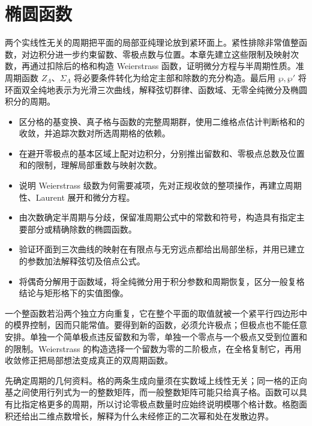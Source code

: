 \chapter{椭圆函数}
\label{b3:ch:22}
\begin{chapterabstract}
两个实线性无关的周期把平面的局部亚纯理论放到紧环面上。紧性排除非常值整函数，对边积分进一步约束留数、零极点数与位置。本章先建立这些限制及映射次数，再通过扣除后的格和构造 Weierstrass 函数，证明微分方程与半周期性质。准周期函数 \(Z_\Lambda\)、\(\Sigma_\Lambda\) 将必要条件转化为给定主部和除数的充分构造。最后用 \(\wp,\wp'\) 将环面双全纯地表示为光滑三次曲线，解释弦切群律、函数域、无零全纯微分及椭圆积分的周期。
\end{chapterabstract}

\begin{learninggoals}
\begin{itemize}
\item 区分格的基变换、真子格与函数的完整周期群，使用二维格点估计判断格和的收敛，并追踪次数对所选周期格的依赖。
\item 在避开零极点的基本区域上配对边积分，分别推出留数和、零极点总数及位置和的限制，理解局部重数与映射次数。
\item 说明 Weierstrass 级数为何需要减项，先对正规收敛的整项操作，再建立周期性、Laurent 展开和微分方程。
\item 由次数确定半周期与分歧，保留准周期公式中的常数和符号，构造具有指定主要部分或精确除数的椭圆函数。
\item 验证环面到三次曲线的映射在有限点与无穷远点都给出局部坐标，并用已建立的参数加法解释弦切及倍点公式。
\item 将偶奇分解用于函数域，将全纯微分用于积分参数和周期恢复，区分一般复格结论与矩形格下的实值图像。
\end{itemize}
\end{learninggoals}

一个整函数若沿两个独立方向重复，它在整个平面的取值就被一个紧平行四边形中的模界控制，因而只能常值。要得到新的函数，必须允许极点；但极点也不能任意安排。单独一个简单极点违反留数和为零，单独一个零点与一个极点又受到位置和的限制。Weierstrass 的构造选择一个留数为零的二阶极点，在全格复制它，再用收敛修正把局部想法变成真正的双周期函数。

\ProseParagraphBreak
{}先确定周期的几何资料。格的两条生成向量须在实数域上线性无关；同一格的正向基之间使用行列式为一的整数矩阵，而一般整数矩阵可能只给真子格。函数可以具有比指定格更多的周期，所以讨论零极点数量时应始终说明模哪个格计数。格胞面积还给出二维点数增长，解释为什么未经修正的二次幂和处在发散边界。

